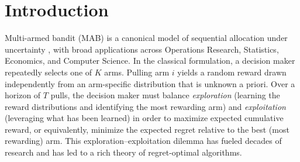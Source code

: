 \documentclass[nonblindrev]{informs3_noinforms}
\begin{document}
%

\section{Introduction}\label{sec:intro}

Multi-armed bandit (MAB) is a canonical model of sequential allocation under uncertainty \citep{gittins2011multi}, with broad applications across Operations Research, Statistics, Economics, and Computer Science. In the classical formulation, a decision maker repeatedly selects one of $K$ arms. Pulling arm $i$ yields a random reward drawn independently from an arm-specific distribution that is unknown a priori. Over a horizon of $T$ pulls, the decision maker must balance \emph{exploration} (learning the reward distributions and identifying the most rewarding arm) and \emph{exploitation} (leveraging what has been learned) in order to maximize expected cumulative reward, or equivalently, minimize the expected regret relative to the best (most rewarding) arm. This exploration--exploitation dilemma has fueled decades of research and has led to a rich theory of regret-optimal algorithms.
\end{document}

